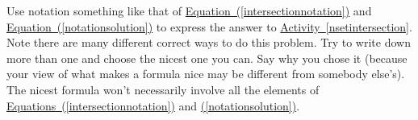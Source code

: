 \documentclass{book}
\begin{document}
\setcounter{cpjt}{221}
\addtocounter{cpjt}{-1}
\begin{activity}\label{inclusion-exclusionunion}
\hypertarget{p-1181}{}%
Use notation something like that of \hyperref[intersectionnotation]{Equation~(\ref{intersectionnotation})} and \hyperref[notationsolution]{Equation~(\ref{notationsolution})} to express the answer to \hyperref[nsetintersection]{Activity~\ref{nsetintersection}}. Note there are many different correct ways to do this problem. Try to write down more than one and choose the nicest one you can. Say why you chose it (because your view of what makes a formula nice may be different from somebody else's). The nicest formula won't necessarily involve all the elements of \hyperref[intersectionnotation]{Equations~(\ref{intersectionnotation})} and \hyperref[notationsolution]{(\ref{notationsolution})}.%
\par\smallskip%
\noindent\end{activity}

\clearpage
\end{document}
